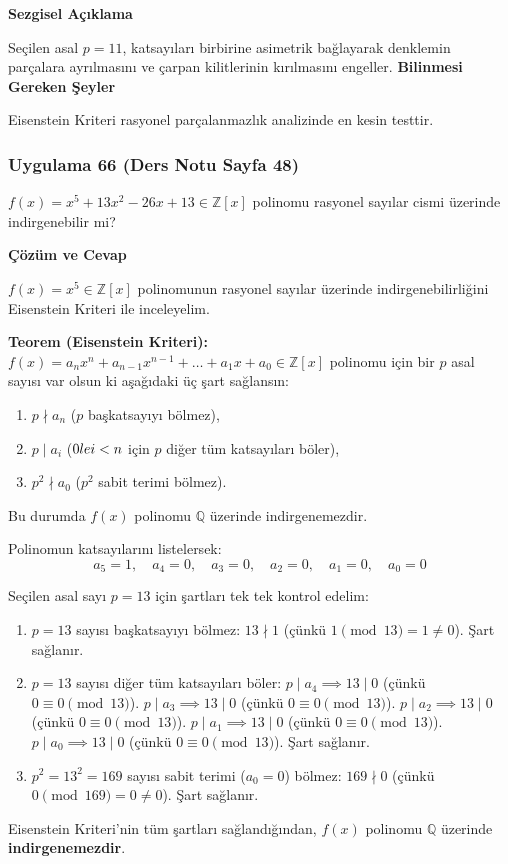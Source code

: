 \documentclass[11pt, a4paper]{article}
\newenvironment{cozum}{
    \vspace{0.5cm}
    \noindent\textcolor{green!60!black}{\faCheckCircle\enspace \textbf{\Large Çözüm ve Cevap}}\par\vspace{0.2cm}
}{}
\newenvironment{sezgisel}{
    \vspace{0.5cm}
    \noindent\textcolor{orange!80!black}{\faLightbulb\enspace \textbf{\Large Sezgisel Açıklama}}\par\vspace{0.2cm}
    \itshape
}{}
\newenvironment{bilgi}{
    \vspace{0.5cm}
    \noindent\textcolor{red!70!black}{\faExclamationTriangle\enspace \textbf{\Large Bilinmesi Gereken Şeyler}}\par\vspace{0.2cm}
}{}
\begin{document}
\begin{sezgisel}
Seçilen asal $p=11$, katsayıları birbirine asimetrik bağlayarak denklemin parçalara ayrılmasını ve çarpan kilitlerinin kırılmasını engeller.
\end{sezgisel}
\begin{bilgi}
Eisenstein Kriteri rasyonel parçalanmazlık analizinde en kesin testtir.
\end{bilgi}

\newpage
\subsubsection{Uygulama 66 (Ders Notu Sayfa 48)}
\begin{sorubox}
$f(x) = x^5 + 13x^2 - 26x + 13 \in \mathbb{Z}[x]$ polinomu rasyonel sayılar cismi üzerinde indirgenebilir mi?
\end{sorubox}
\begin{cozum}
$f(x) = x^{5} \in \mathbb{Z}[x]$ polinomunun rasyonel sayılar üzerinde indirgenebilirliğini Eisenstein Kriteri ile inceleyelim.

\textbf{Teorem (Eisenstein Kriteri):} $f(x) = a_n x^n + a_{n-1} x^{n-1} + \dots + a_1 x + a_0 \in \mathbb{Z}[x]$ polinomu için bir $p$ asal sayısı var olsun ki aşağıdaki üç şart sağlansın:
\begin{enumerate}
    \item $p \nmid a_n$ ($p$ başkatsayıyı bölmez),
    \item $p \mid a_i$ ($0 \\le i < n$ için $p$ diğer tüm katsayıları böler),
    \item $p^2 \nmid a_0$ ($p^2$ sabit terimi bölmez).
\end{enumerate}
Bu durumda $f(x)$ polinomu $\mathbb{Q}$ üzerinde indirgenemezdir.

Polinomun katsayılarını listelersek:
\[ a_{5} = 1, \quad a_{4} = 0, \quad a_{3} = 0, \quad a_{2} = 0, \quad a_{1} = 0, \quad a_{0} = 0 \]

Seçilen asal sayı $p = 13$ için şartları tek tek kontrol edelim:
\begin{enumerate}
    \item $p = 13$ sayısı başkatsayıyı bölmez: $13 \nmid 1$ (çünkü $1 \pmod{13} = 1 \neq 0$). Şart sağlanır.
    \item $p = 13$ sayısı diğer tüm katsayıları böler:
    $p \mid a_{4} \implies 13 \mid 0$ (çünkü $0 \equiv 0 \pmod{13}$).
    $p \mid a_{3} \implies 13 \mid 0$ (çünkü $0 \equiv 0 \pmod{13}$).
    $p \mid a_{2} \implies 13 \mid 0$ (çünkü $0 \equiv 0 \pmod{13}$).
    $p \mid a_{1} \implies 13 \mid 0$ (çünkü $0 \equiv 0 \pmod{13}$).
    $p \mid a_{0} \implies 13 \mid 0$ (çünkü $0 \equiv 0 \pmod{13}$).
    Şart sağlanır.
    \item $p^2 = 13^2 = 169$ sayısı sabit terimi ($a_0 = 0$) bölmez: $169 \nmid 0$ (çünkü $0 \pmod{169} = 0 \neq 0$). Şart sağlanır.
\end{enumerate}

Eisenstein Kriteri'nin tüm şartları sağlandığından, $f(x)$ polinomu $\mathbb{Q}$ üzerinde \textbf{indirgenemezdir}.
\end{cozum}
\end{document}
